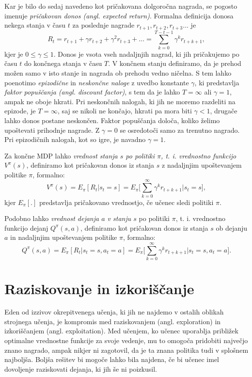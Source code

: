 \documentclass[a4paper, oneside, 12pt]{report}
\begin{document}
Kar je bilo do sedaj navedeno kot pričakovana dolgoročna nagrada, se pogosto imenuje {\em pričakovan donos (angl. expected return)}. Formalna definicija donosa nekega stanja v času $t$ za poslednje nagrade $r_{t+1}, r_{t+2}, r_{t+3} \dots$ je
\begin{equation}
R_t = r_{t+1} + \gamma r_{t+2} + \gamma^2 r_{t+3} + \dots = \sum_{k=0}^{T-t-1} \gamma^k r_{t+k+1},
\end{equation}
kjer je $0 \le \gamma \le 1$. Donos je vsota vseh nadaljnjih nagrad, ki jih pričakujemo po času $t$ do končnega stanja v času $T$. V končnem stanju definiramo, da je prehod možen samo v isto stanje in nagrada ob prehodu vedno ničelna. S tem lahko poenotimo {\em epizodične} in {\em neskončne naloge} z uvedbo konstante $\gamma$, ki predstavlja {\em faktor popuščanja (angl. discount factor)}, s tem da je lahko $T = \infty$ ali $\gamma = 1$, ampak ne oboje hkrati. Pri neskončnih nalogah, ki jih ne moremo razdeliti na epizode, je $T = \infty$, saj se nikoli ne končajo, hkrati pa mora biti $\gamma < 1$, drugače lahko donos postane neskončen. Faktor popuščanja določa, koliko želimo upoštevati prihodnje nagrade. Z $\gamma = 0$ se osredotoči samo za trenutno nagrado. Pri epizodičnih nalogah, kot so igre, je navadno $\gamma = 1$.

Za končne MDP lahko {\em vrednost stanja $s$ po politiki $\pi$, t. i. vrednostno funkcijo $V^\pi(s)$}, definiramo kot pričakovan donos iz stanja $s$ z nadaljnjim upoštevanjem politike $\pi$, formalno:
\begin{equation}
V^\pi(s) = E_\pi[R_t | s_t = s] = E_\pi\Bigg[\sum_{k=0}^\infty \gamma^k r_{t+k+1} \Bigg| s_t = s\Bigg],
\end{equation}
kjer $E_\pi[.]$ predstavlja pričakovano vrednostjo, če učenec sledi politiki $\pi$.

Podobno lahko {\em vrednost dejanja $a$ v stanju $s$} po politiki $\pi$, t. i. vrednostno funkcijo dejanj $Q^\pi(s, a)$, definiramo kot pričakovan donos iz stanja $s$ ob dejanju $a$ in nadaljnjim upoštevanjem politike $\pi$, formalno:
\begin{equation}
Q^\pi(s, a) = E_\pi[R_t | s_t = s, a_t = a] = E_\pi\Bigg[\sum_{k=0}^\infty \gamma^k r_{t+k+1} \Bigg| s_t = s, a_t = a\Bigg].
\end{equation}

\section{Raziskovanje in izkoriščanje}
Eden od izzivov okrepitvenega učenja, ki jih ne najdemo v ostalih oblikah strojnega učenja, je kompromis med raziskovanjem (angl. exploration) in izkoriščanjem (angl. exploitation). Med učenjem, ko učenec uporablja približek optimalne vrednostne funkcije za svoje vedenje, mu to omogoča pridobiti največjo znano nagrado, ampak nikjer ni zagotovil, da je ta znana politika tudi v splošnem najboljša. Boljša rešitev bi mogoče lahko bila najdena, če bi učenec imel dovoljenje raziskovati dejanja, ki jih še ni poizkusil.
\end{document}

